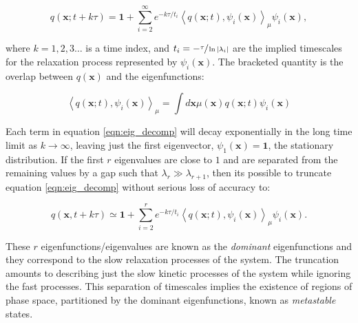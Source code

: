 \begin{equation}\label{eqn:eig_decomp}
q(\mathbf{x} ; t+k \tau)=\mathbf{1}+\sum_{i=2}^{\infty} e^{-k \tau / t_{i}}\left\langle q(\mathbf{x} ; t), \psi_{i}(\mathbf{x})\right\rangle_{\mu} \psi_{i}(\mathbf{x}),
\end{equation}

where $k=1,2,3 \ldots$ is a time index, and $t_{i}=-\sfrac{\tau}{\ln{|\lambda_{i}|}}$ are the implied timescales for the relaxation process represented by $\psi_{i}(\mathbf{x})$. The bracketed quantity is the overlap between $q(\mathbf{x})$ and the eigenfunctions:

\begin{equation}
\left\langle q(\mathbf{x} ; t), \psi_{i}(\mathbf{x})\right\rangle_{\mu}=\int d \mathbf{x} \mu(\mathbf{x}) q(\mathbf{x} ; t) \psi_{i}(\mathbf{x})
\end{equation}

Each term in equation \ref{eqn:eig_decomp} will decay exponentially in the long time limit as $k \rightarrow \infty$, leaving just the first eigenvector, $\psi_{1}(\mathbf{x})=\mathbf{1}$, the stationary distribution. If the first $r$ eigenvalues are close to $1$ and are separated from the remaining values by a gap such that $\lambda_{r} \gg \lambda_{r+1}$, then its possible to truncate equation \ref{eqn:eig_decomp} without serious loss of accuracy to:

\begin{equation}\label{eqn:eig_decomp_to_r}
q(\mathbf{x},  t+k \tau)  \simeq \mathbf{1}+\sum_{i=2}^{r} e^{-k \tau / t_{i}}\left\langle q(\mathbf{x} ; t), \psi_{i}(\mathbf{x})\right\rangle_{\mu} \psi_{i}(\mathbf{x}).
\end{equation}

These $r$ eigenfunctions/eigenvalues are known as the \emph{dominant} eigenfunctions and they correspond to the slow relaxation processes of the system. The truncation amounts to describing just the slow kinetic processes of the system while ignoring the fast processes. This separation of timescales implies the existence of regions of phase space, partitioned by the dominant eigenfunctions, known as \emph{metastable} states. 


